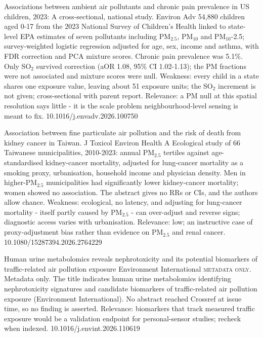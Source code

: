 \documentclass[10pt]{article}
\begin{document}
{Associations between ambient air pollutants and chronic pain prevalence in US children, 2023: A cross-sectional, national study.}
{Environ Adv}
{54,880 children aged 0-17 from the 2023 National Survey of Children's Health linked to state-level EPA estimates of seven pollutants including PM$_{2.5}$, PM$_{10}$ and PM$_{10}$-2.5; survey-weighted logistic regression adjusted for age, sex, income and asthma, with FDR correction and PCA mixture scores. Chronic pain prevalence was 5.1\%. Only SO$_2$ survived correction (aOR 1.08, 95\% CI 1.02-1.13); the PM fractions were not associated and mixture scores were null. Weakness: every child in a state shares one exposure value, leaving about 51 exposure units; the SO$_2$ increment is not given; cross-sectional with parent report. Relevance: a PM null at this spatial resolution says little - it is the scale problem neighbourhood-level sensing is meant to fix.}
{10.1016/j.envadv.2026.100750}

{Association between fine particulate air pollution and the risk of death from kidney cancer in Taiwan.}
{J Toxicol Environ Health A}
{Ecological study of 66 Taiwanese municipalities, 2010-2023: annual PM$_{2.5}$ tertiles against age-standardised kidney-cancer mortality, adjusted for lung-cancer mortality as a smoking proxy, urbanisation, household income and physician density. Men in higher-PM$_{2.5}$ municipalities had significantly lower kidney-cancer mortality; women showed no association. The abstract gives no RRs or CIs, and the authors allow chance. Weakness: ecological, no latency, and adjusting for lung-cancer mortality - itself partly caused by PM$_{2.5}$ - can over-adjust and reverse signs; diagnostic access varies with urbanisation. Relevance: low; an instructive case of proxy-adjustment bias rather than evidence on PM$_{2.5}$ and renal cancer.}
{10.1080/15287394.2026.2764229}

{Human urine metabolomics reveals nephrotoxicity and its potential biomarkers of traffic-related air pollution exposure}
{Environment International}
{\textsc{metadata only.} Metadata only. The title indicates human urine metabolomics identifying nephrotoxicity signatures and candidate biomarkers of traffic-related air pollution exposure (Environment International). No abstract reached Crossref at issue time, so no finding is asserted. Relevance: biomarkers that track measured traffic exposure would be a validation endpoint for personal-sensor studies; recheck when indexed.}
{10.1016/j.envint.2026.110619}
\end{document}
